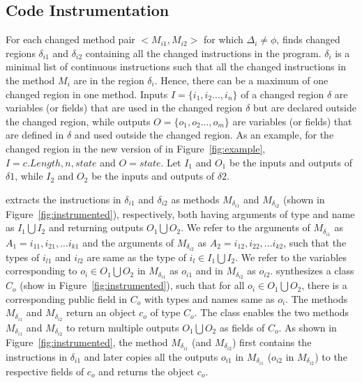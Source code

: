 \subsection{Code Instrumentation}
For each changed method pair $<$$M_{i1}, M_{i2}$$>$ for which $\Delta_i \neq \phi$,  finds changed regions $\delta_{i1}$ and $\delta_{i2}$ containing all the changed instructions in the program. $\delta_i$ is a minimal list of continuous instructions such that all the changed instructions in the method $M_i$ are in the region $\delta_i$. Hence, there can be a maximum of one changed region in one method.
Inputs $I = \{i_1, i_2...,i_n\}$ of a changed region $\delta$ are variables (or fields) that are used 
in the changed region $\delta$ but are declared outside the changed region, 
while outputs $O = \{o_1, o_2...,o_m\}$ are variables (or fields) 
that are defined in $\delta$ and used outside the changed region.
As an example, for the changed region in the new version of  in Figure~\ref{fig:example}, $I = {c.Length, n, state}$ and $O = {state}$.
Let $I_1$ and $O_1$ be the inputs and outputs of $\delta1$, while $I_2$ and $O_2$ be the inputs and outputs of $\delta2$.

 extracts the instructions in $\delta_{i1}$ and $\delta_{i2}$ as methods $M_{\delta_{i1}}$ and 
$M_{\delta_{i2}}$ (shown in Figure~\ref{fig:instrumented}), respectively, both having arguments of type and name as $I_1 \bigcup I_2$ and returning outputs 
$O_1 \bigcup O_2$.
We refer to the arguments of $M_{\delta_{i1}}$ as $A_{1} = {i_{11}, i_{21},...i_{k1}}$ and the arguments of 
$M_{\delta_{i2}}$ as $A_{2} = {i_{12}, i_{22},...i_{k2}}$, such that the types of $i_{l1}$ and $i_{l2}$
are same as the type of $i_l \in I_1 \bigcup I_2$.
We refer to the variables corresponding to $o_i \in O_1 \bigcup O_2$ in $M_{\delta_{i1}}$ as $o_{i1}$ and in 
$M_{\delta_{i2}}$ as $o_{i2}$.
 synthesizes a class $C_o$ (show in Figure~\ref{fig:instrumented}), such that 
for all $o_i \in O_1 \bigcup O_2$, there is a corresponding public field in $C_o$ with 
types and names same as $o_i$.
The methods $M_{\delta_{i1}}$ and $M_{\delta_{i2}}$ return an object $c_o$ of type $C_o$.
The class enables the two methods $M_{\delta_{i1}}$ and $M_{\delta_{i2}}$
to return multiple outputs $O_1 \bigcup O_2$ as fields of $C_o$.
As shown in Figure~\ref{fig:instrumented}, the method $M_{\delta_{i1}}$ (and $M_{\delta_{i2}}$)
first contains the instructions in $\delta_{i1}$ and later copies all the outputs 
$o_{i1}$ in $M_{\delta_{i1}}$ ($o_{i2}$ in $M_{\delta_{i2}}$) to the respective fields 
of $c_o$ and returns the object $c_o$.


